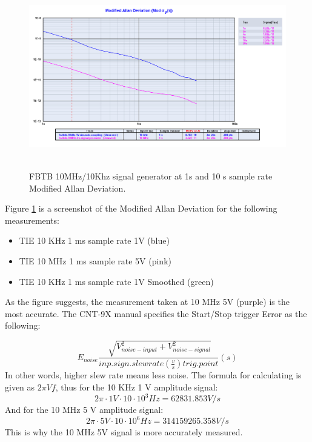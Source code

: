 \documentclass[11pt,english,a4paper]{article}
\begin{document}
\begin{figure}[!htb]
  \centering
    \includegraphics[width=1\textwidth]{fbtb_10mhzkhz_generator_mod_allan.png}\
  \caption{FBTB 10MHz/10Khz signal generator at 1s and 10 s sample rate Modified Allan Deviation.}
      \label{fig:sg_10x_mod_allan_dev}
\end{figure}

Figure \ref{fig:sg_10x_mod_allan_dev} is a screenshot of the Modified Allan Deviation for the following measurements:
\begin{itemize}
  \item TIE 10 KHz 1 ms sample rate 1V (blue)
  \item TIE 10 MHz 1 ms sample rate 5V (pink)
  \item TIE 10 KHz 1 ms sample rate 1V Smoothed (green)
\end{itemize}
As the figure suggests, the measurement taken at 10 MHz 5V (purple) is the most accurate. The CNT-9X manual specifies the Start/Stop trigger Error as the following:

\begin{displaymath}
E_{noise}\frac{\sqrt[]{V_{noise-input}^2 + V_{noise-signal}^2}}{inp.sign.slew rate(\frac{v}{s}) trig. point}(s)
\end{displaymath}
In other words, higher slew rate means less noise. The formula for calculating is given as $2\pi Vf$, thus for the 10 KHz 1 V amplitude signal:
\begin{displaymath}
2\pi\cdot1 V\cdot10\cdot10^3 Hz = 62831.853 V/s
\end{displaymath}
And for the 10 MHz 5 V amplitude signal:
\begin{displaymath}
2\pi\cdot5 V\cdot10\cdot10^6 Hz = 314159265.358 V/s
\end{displaymath}
This is why the 10 MHz 5V signal is more accurately measured.
\end{document}
